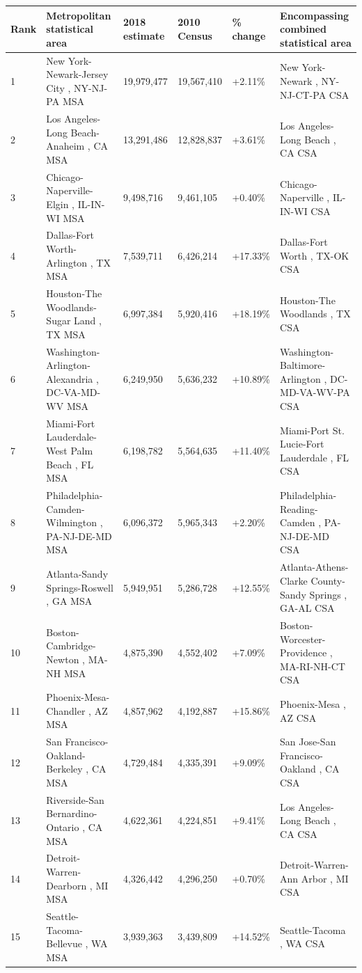 \documentclass{article}
\begin{document}
\begin{tabular}{llllll}
\toprule
Rank & Metropolitan statistical area & 2018 estimate & 2010 Census & \% change & Encompassing combined statistical area \\
\midrule
1 & New York-Newark-Jersey City , NY-NJ-PA MSA & 19,979,477 & 19,567,410 & +2.11\% & New York-Newark , NY-NJ-CT-PA CSA \\
2 & Los Angeles-Long Beach-Anaheim , CA MSA & 13,291,486 & 12,828,837 & +3.61\% & Los Angeles-Long Beach , CA CSA \\
3 & Chicago-Naperville-Elgin , IL-IN-WI MSA & 9,498,716 & 9,461,105 & +0.40\% & Chicago-Naperville , IL-IN-WI CSA \\
4 & Dallas-Fort Worth-Arlington , TX MSA & 7,539,711 & 6,426,214 & +17.33\% & Dallas-Fort Worth , TX-OK CSA \\
5 & Houston-The Woodlands-Sugar Land , TX MSA & 6,997,384 & 5,920,416 & +18.19\% & Houston-The Woodlands , TX CSA \\
6 & Washington-Arlington-Alexandria , DC-VA-MD-WV MSA & 6,249,950 & 5,636,232 & +10.89\% & Washington-Baltimore-Arlington , DC-MD-VA-WV-PA CSA \\
7 & Miami-Fort Lauderdale-West Palm Beach , FL MSA & 6,198,782 & 5,564,635 & +11.40\% & Miami-Port St. Lucie-Fort Lauderdale , FL CSA \\
8 & Philadelphia-Camden-Wilmington , PA-NJ-DE-MD MSA & 6,096,372 & 5,965,343 & +2.20\% & Philadelphia-Reading-Camden , PA-NJ-DE-MD CSA \\
9 & Atlanta-Sandy Springs-Roswell , GA MSA & 5,949,951 & 5,286,728 & +12.55\% & Atlanta-Athens-Clarke County-Sandy Springs , GA-AL CSA \\
10 & Boston-Cambridge-Newton , MA-NH MSA & 4,875,390 & 4,552,402 & +7.09\% & Boston-Worcester-Providence , MA-RI-NH-CT CSA \\
11 & Phoenix-Mesa-Chandler , AZ MSA & 4,857,962 & 4,192,887 & +15.86\% & Phoenix-Mesa , AZ CSA \\
12 & San Francisco-Oakland-Berkeley , CA MSA & 4,729,484 & 4,335,391 & +9.09\% & San Jose-San Francisco-Oakland , CA CSA \\
13 & Riverside-San Bernardino-Ontario , CA MSA & 4,622,361 & 4,224,851 & +9.41\% & Los Angeles-Long Beach , CA CSA \\
14 & Detroit-Warren-Dearborn , MI MSA & 4,326,442 & 4,296,250 & +0.70\% & Detroit-Warren-Ann Arbor , MI CSA \\
15 & Seattle-Tacoma-Bellevue , WA MSA & 3,939,363 & 3,439,809 & +14.52\% & Seattle-Tacoma , WA CSA \\

\end{tabular}
\end{document}
